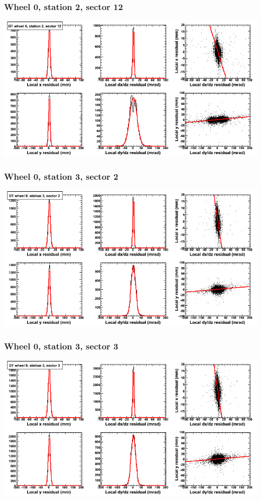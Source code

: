 \documentclass[compress]{beamer}
\begin{document}
\begin{frame}
\frametitle{Wheel 0, station 2, sector 12}
\includegraphics[width=\linewidth]{tmpbell_MBwhCst2sec12.png}
\end{frame}

\begin{frame}
\frametitle{Wheel 0, station 3, sector 2}
\includegraphics[width=\linewidth]{tmpbell_MBwhCst3sec02.png}
\end{frame}

\begin{frame}
\frametitle{Wheel 0, station 3, sector 3}
\includegraphics[width=\linewidth]{tmpbell_MBwhCst3sec03.png}
\end{frame}
\end{document}
